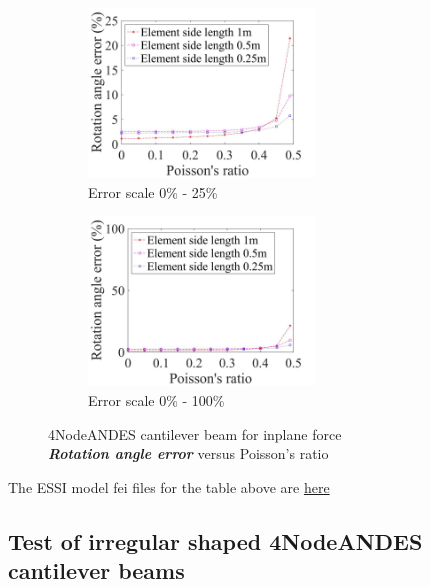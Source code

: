 \documentclass[fleqn,11pt,letter]{article}
\begin{document}
\begin{figure}[H]
  \begin{subfigure}{0.5\textwidth}
    \centering
    \includegraphics[width=6cm]{../Figure_files/4NodeANDES/error4andes_beam_dif_poisson_angle_inplane_div.jpeg}
    \caption{Error scale 0\% - 25\%}
  \end{subfigure}
  \begin{subfigure}{0.5\textwidth}
    \centering
    \includegraphics[width=6cm]{../Figure_files/4NodeANDES/error4andes_beam_dif_poisson_angle_inplane_div100.jpeg}
    \caption{Error scale 0\% - 100\%}
  \end{subfigure}
  \captionsetup{justification=centering,margin=2cm}
  \caption{4NodeANDES cantilever beam for inplane force\\
      \emph{\textbf{Rotation angle error}}   versus   Poisson's ratio}
  \label{table angle error 4NodeANDES cantilever beam for different Poisson ratio 2}
\end{figure}



The ESSI model fei files for the table above are \href{https://github.com/yuan-energy/ESSI_Verification/blob/master/4NodeANDES/cantilever_different_Poisson/cantilever_different_Poisson.tar.gz?raw=true}{here}






\newpage
\subsection{Test of irregular shaped 4NodeANDES cantilever beams}
\end{document}

